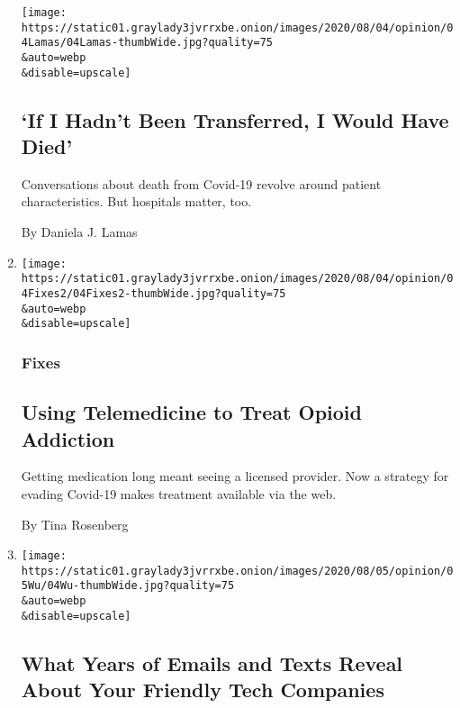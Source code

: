 \begin{enumerate}
  \texttt{[image: https://static01.graylady3jvrrxbe.onion/images/2020/08/04/opinion/04Lamas/04Lamas-thumbWide.jpg?quality=75\\\&auto=webp\\\&disable=upscale]}

  \hypertarget{if-i-hadnt-been-transferred-i-would-have-died}{%
  \subsection{`If I Hadn't Been Transferred, I Would Have
  Died'}\label{if-i-hadnt-been-transferred-i-would-have-died}}

  Conversations about death from Covid-19 revolve around patient
  characteristics. But hospitals matter, too.

  By Daniela J. Lamas
\item
  \href{/2020/08/04/opinion/opioid-telemedicine-covid.html}{}

  \texttt{[image: https://static01.graylady3jvrrxbe.onion/images/2020/08/04/opinion/04Fixes2/04Fixes2-thumbWide.jpg?quality=75\\\&auto=webp\\\&disable=upscale]}

  \hypertarget{fixes}{%
  \subsubsection{Fixes}\label{fixes}}

  \hypertarget{using-telemedicine-to-treat-opioid-addiction}{%
  \subsection{Using Telemedicine to Treat Opioid
  Addiction}\label{using-telemedicine-to-treat-opioid-addiction}}

  Getting medication long meant seeing a licensed provider. Now a
  strategy for evading Covid-19 makes treatment available via the web.

  By Tina Rosenberg
\item
  \href{/2020/08/04/opinion/amazon-facebook-congressional-hearings.html}{}

  \texttt{[image: https://static01.graylady3jvrrxbe.onion/images/2020/08/05/opinion/05Wu/04Wu-thumbWide.jpg?quality=75\\\&auto=webp\\\&disable=upscale]}

  \hypertarget{what-years-of-emails-and-texts-reveal-about-your-friendly-tech-companies}{%
  \subsection{What Years of Emails and Texts Reveal About Your Friendly
  Tech
  Companies}\label{what-years-of-emails-and-texts-reveal-about-your-friendly-tech-companies}}


\end{enumerate}
